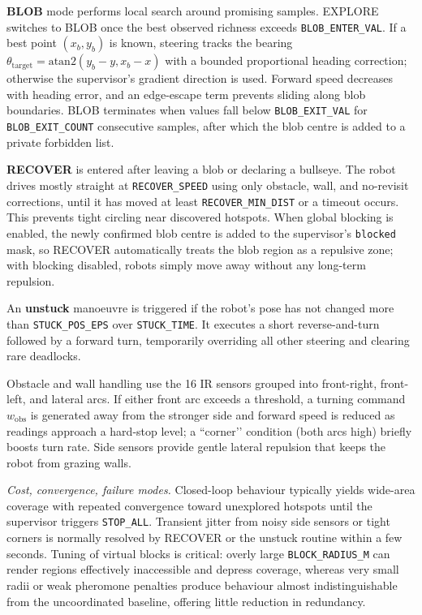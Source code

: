 \documentclass[lettersize,journal]{IEEEtran}
\begin{document}
\textbf{BLOB} mode performs local search around promising samples. EXPLORE
switches to BLOB once the best observed richness exceeds
\texttt{BLOB\_ENTER\_VAL}. If a best point $(x_b,y_b)$ is known, steering tracks
the bearing $\theta_{\mathrm{target}}=\mathrm{atan2}(y_b-y,x_b-x)$ with a
bounded proportional heading correction; otherwise the supervisor’s gradient
direction is used. Forward speed decreases with heading error, and an
edge-escape term prevents sliding along blob boundaries. BLOB terminates when
values fall below \texttt{BLOB\_EXIT\_VAL} for
\texttt{BLOB\_EXIT\_COUNT} consecutive samples, after which the blob centre is
added to a private forbidden list.

\textbf{RECOVER} is entered after leaving a blob or declaring a bullseye. The
robot drives mostly straight at \texttt{RECOVER\_SPEED} using only obstacle,
wall, and no-revisit corrections, until it has moved at least
\texttt{RECOVER\_MIN\_DIST} or a timeout occurs. This prevents tight circling
near discovered hotspots. When global blocking is enabled, the newly confirmed blob centre is added to
the supervisor’s \texttt{blocked} mask, so RECOVER automatically treats the blob
region as a repulsive zone; with blocking disabled, robots simply move away
without any long-term repulsion.

An \textbf{unstuck} manoeuvre is triggered if the robot’s pose has not changed
more than \texttt{STUCK\_POS\_EPS} over \texttt{STUCK\_TIME}. It executes a
short reverse-and-turn followed by a forward turn, temporarily overriding all
other steering and clearing rare deadlocks.

Obstacle and wall handling use the 16 IR sensors grouped into front-right,
front-left, and lateral arcs. If either front arc exceeds a threshold, a
turning command $w_{\mathrm{obs}}$ is generated away from the stronger side and
forward speed is reduced as readings approach a hard-stop level; a
“corner’’ condition (both arcs high) briefly boosts turn rate. Side sensors
provide gentle lateral repulsion that keeps the robot from grazing walls.

\textit{Cost, convergence, failure modes.}
Closed-loop behaviour typically yields wide-area coverage with repeated
convergence toward unexplored hotspots until the supervisor triggers
\texttt{STOP\_ALL}. Transient jitter from noisy side sensors or tight corners
is normally resolved by RECOVER or the unstuck routine within a few seconds.
Tuning of virtual blocks is critical: overly large \texttt{BLOCK\_RADIUS\_M}
can render regions effectively inaccessible and depress coverage, whereas
very small radii or weak pheromone penalties produce behaviour almost
indistinguishable from the uncoordinated baseline, offering little reduction
in redundancy.
\end{document}
